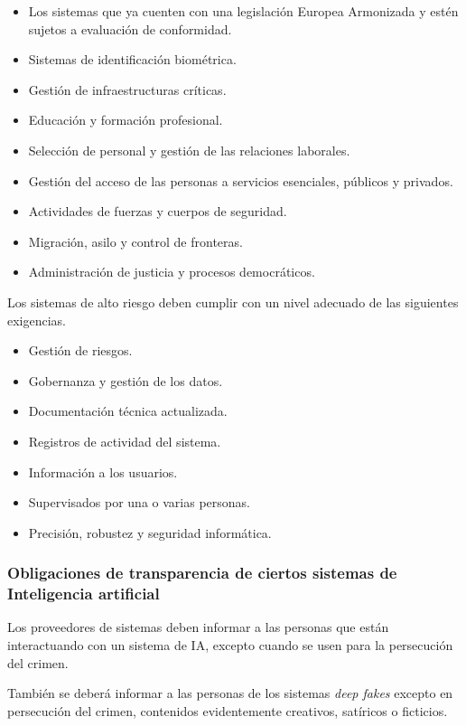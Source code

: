 \begin{itemize}
    \item Los sistemas que ya cuenten con una legislación Europea Armonizada y estén sujetos a evaluación de conformidad.
    \item Sistemas de identificación biométrica.
    \item Gestión de infraestructuras críticas.
    \item Educación y formación profesional.
    \item Selección de personal y gestión de las relaciones laborales.
    \item Gestión del acceso de las personas a servicios esenciales, públicos y privados.
    \item Actividades de fuerzas y cuerpos de seguridad.
    \item Migración, asilo y control de fronteras.
    \item Administración de justicia y procesos democráticos.
\end{itemize}

Los sistemas de alto riesgo deben cumplir con un nivel adecuado de las siguientes exigencias.

\begin{itemize}
    \item Gestión de riesgos.
    \item Gobernanza y gestión de los datos.
    \item Documentación técnica actualizada.
    \item Registros de actividad del sistema.
    \item Información a los usuarios.
    \item Supervisados por una o varias personas.
    \item Precisión, robustez y seguridad informática.
\end{itemize}

\subsubsection{Obligaciones de transparencia de ciertos sistemas de Inteligencia artificial}

Los proveedores de sistemas deben informar a las personas que están interactuando con un sistema de \acrfull{IA}, excepto cuando se usen para la persecución del crimen.

También se deberá informar a las personas de los sistemas \textit{deep fakes} excepto en persecución del crimen, contenidos evidentemente creativos, satíricos o ficticios.


